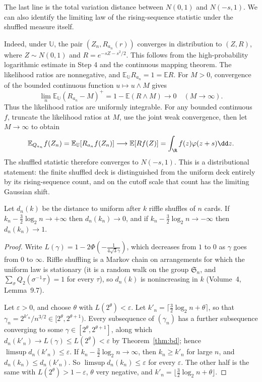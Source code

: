 The last line is the total variation distance between $N(0,1)$ and $N(-s,1)$. We can also identify the limiting law of the rising-sequence statistic under the shuffled measure itself.

Indeed, under $\mathbb U$, the pair $(Z_n,R_{a_n}(r))$ converges in distribution to $(Z,R)$, where $Z\sim N(0,1)$ and $R=e^{-sZ-s^2/2}$. This follows from the high-probability logarithmic estimate in Step 4 and the continuous mapping theorem. The likelihood ratios are nonnegative, and $\mathbb E_{\mathbb U}R_{a_n}=1=\mathbb ER$. For $M>0$, convergence of the bounded continuous function $u\mapsto u\wedge M$ gives
\[
\lim_n\mathbb E_{\mathbb U}(R_{a_n}-M)^+=1-\mathbb E(R\wedge M)\longrightarrow0
\quad(M\to\infty).
\]
Thus the likelihood ratios are uniformly integrable. For any bounded continuous $f$, truncate the likelihood ratios at $M$, use the joint weak convergence, then let $M\to\infty$ to obtain
\[
\mathbb E_{Q_{a_n}}f(Z_n)=\mathbb E_{\mathbb U}[R_{a_n}f(Z_n)]
\longrightarrow\mathbb E[Rf(Z)]=\int_\R f(z)\varphi(z+s)\dd z.
\]
The shuffled statistic therefore converges to $N(-s,1)$. This is a distributional statement: the finite shuffled deck is distinguished from the uniform deck entirely by its rising-sequence count, and on the cutoff scale that count has the limiting Gaussian shift.

\begin{corollary}\label{cor:riffle}
Let $d_n(k)$ be the distance to uniform after $k$ riffle shuffles of $n$ cards. If $k_n-\frac32\log_2n\to+\infty$ then $d_n(k_n)\to0$, and if $k_n-\frac32\log_2n\to-\infty$ then $d_n(k_n)\to1$.
\end{corollary}

\begin{proof}
Write $L(\gamma)=1-2\Phi(-\frac1{4\sqrt3\gamma})$, which decreases from $1$ to $0$ as $\gamma$ goes from $0$ to $\infty$. Riffle shuffling is a Markov chain on arrangements for
which the uniform law is stationary (it is a random walk on the group $\mathfrak S_n$, and $\sum_\sigma Q_2(\sigma^{-1}\tau)=1$ for every $\tau$), so $d_n(k)$ is
nonincreasing in $k$ (Volume~4, Lemma~9.7).

Let $\varepsilon>0$, and choose $\theta$ with $L(2^\theta)<\varepsilon$. Let $k'_n=\lceil\frac32\log_2n+\theta\rceil$, so that $\gamma_n=2^{k'_n}/n^{3/2}\in[2^\theta,2^{\theta+1})$. Every subsequence of $(\gamma_n)$ has a further
subsequence converging to some $\gamma\in[2^\theta,2^{\theta+1}]$, along which $d_n(k'_n)\to L(\gamma)\le L(2^\theta)<\varepsilon$ by Theorem~\ref{thm:bd}; hence $\limsup d_n(k'_n)\le\varepsilon$. If $k_n-\frac32\log_2n\to\infty$,
then $k_n\ge k'_n$ for large $n$, and $d_n(k_n)\le d_n(k'_n)$. So $\limsup d_n(k_n)\le\varepsilon$ for every $\varepsilon$. The other half is the same with $L(2^\theta)>1-\varepsilon$, $\theta$ very negative, and $k'_n=\lfloor\frac32\log_2n+\theta\rfloor$.
\end{proof}

